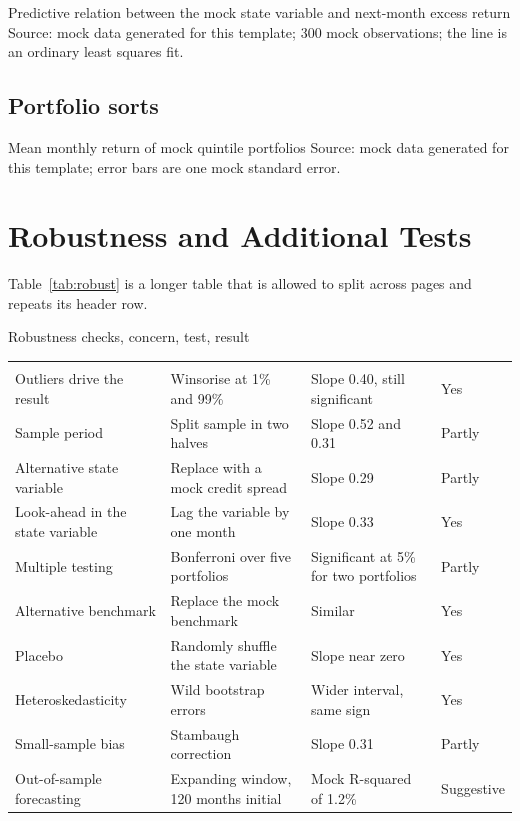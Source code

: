 \documentclass{lrreview}
\begin{document}
  {Predictive relation between the mock state variable and next-month excess return}
  {Source: mock data generated for this template; 300 mock observations; the line is an ordinary least squares fit.}

\subsection{Portfolio sorts}
  {Mean monthly return of mock quintile portfolios}
  {Source: mock data generated for this template; error bars are one mock standard error.}

\section{Robustness and Additional Tests}

Table~\ref{tab:robust} is a longer table that is allowed to split across pages
and repeats its header row.

\begin{lrtable}{Robustness checks, concern, test, result}\label{tab:robust}
\lrsans\fontsize{8.4}{10.5}\selectfont
\begin{xltabular}{\linewidth}{@{}L L L L@{}}
\lrtoprule
{} &  &  & \\
\lrheadrule
\endhead
\lrbottomrule
\endfoot
Outliers drive the result & Winsorise at 1\% and 99\% & Slope 0.40, still significant & Yes\\
\lrrowrule
Sample period & Split sample in two halves & Slope 0.52 and 0.31 & Partly\\
\lrrowrule
Alternative state variable & Replace with a mock credit spread & Slope 0.29 & Partly\\
\lrrowrule
Look-ahead in the state variable & Lag the variable by one month & Slope 0.33 & Yes\\
\lrrowrule
Multiple testing & Bonferroni over five portfolios & Significant at 5\% for two portfolios & Partly\\
\lrrowrule
Alternative benchmark & Replace the mock benchmark & Similar & Yes\\
\lrrowrule
Placebo & Randomly shuffle the state variable & Slope near zero & Yes\\
\lrrowrule
Heteroskedasticity & Wild bootstrap errors & Wider interval, same sign & Yes\\
\lrrowrule
Small-sample bias & Stambaugh correction & Slope 0.31 & Partly\\
\lrrowrule
Out-of-sample forecasting & Expanding window, 120 months initial & Mock R-squared of 1.2\% & Suggestive\\
\end{xltabular}
\end{lrtable}
\end{document}
